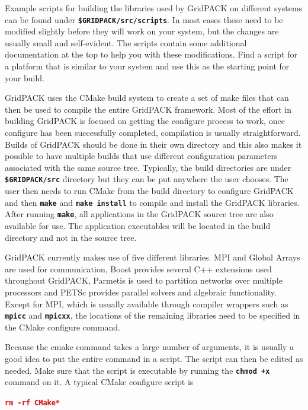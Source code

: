\documentclass[12pt]{report} %
\begin{document}
Example scripts for building the libraries used by GridPACK on different systems can be found under \texttt{\textbf{\$GRIDPACK/src/scripts}}. In most cases these need to be modified slightly before they will work on your system, but the changes are usually small and self-evident. The scripts contain some additional documentation at the top to help you with these modifications. Find a script for a platform that is similar to your system and use this as the starting point for your build.

GridPACK uses the CMake build system to create a set of make files that can then be used to compile the entire GridPACK framework. Most of the effort in building GridPACK is focused on getting the configure process to work, once configure has been successfully completed, compilation is usually straightforward. Builds of GridPACK should be done in their own directory and this also makes it possible to have multiple builds that use different configuration parameters associated with the same source tree. Typically, the build directories are under \texttt{\textbf{\$GRIDPACK/src}} directory but they can be put anywhere the user chooses. The user then needs to run CMake from the build directory to configure GridPACK and then \texttt{\textbf{make}} and \texttt{\textbf{make install}} to compile and install the GridPACK libraries. After running \texttt{\textbf{make}}, all applications in the GridPACK source tree are also available for use. The application executables will be located in the build directory and not in the source tree. 

GridPACK currently makes use of five different libraries. MPI and Global Arrays are used for communication, Boost provides several C++ extensions used throughout GridPACK, Parmetis is used to partition networks over multiple processors and PETSc provides parallel solvers and algebraic functionality. Except for MPI, which is usually available through compiler wrappers such as \texttt{\textbf{mpicc}} and \texttt{\textbf{mpicxx}}, the locations of the remaining libraries need to be specified in the CMake configure command.

Because the cmake command takes a large number of arguments, it is usually a good idea to put the entire command in a script. The script can then be edited as needed. Make sure that the script is executable by running the \texttt{\textbf{chmod +x}} command on it. A typical CMake configure script is

\textcolor{red}{\texttt{\textbf{rm -rf CMake*}}}
\end{document}
